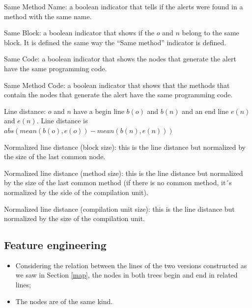 \documentclass[
]{article}
\begin{document}
\normalsize

Same Method Name: a boolean indicator that tells if the alerts were
found in a method with the same name.

Same Block: a boolean indicator that shows if the \(o\) and \(n\) belong
to the same block. It is defined the same way the ``Same method''
indicator is defined.

Same Code: a boolean indicator that shows the nodes that generate the
alert have the same programming code.

Same Method Code: a boolean indicator that shows that the methods that
contain the nodes that generate the alert have the same programming
code.

Line distance: \(o\) and \(n\) have a begin line \(b(o)\) and \(b(n)\)
and an end line \(e(n)\) and \(e(n)\). Line distance is
\(abs(mean(b(o), e(o)) - mean(b(n), e(n)))\)

Normalized line distance (block size): this is the line distance but
normalized by the size of the last common node.

Normalized line distance (method size): this is the line distance but
normalized by the size of the last common method (if there is no common
method, it´s normalized by the side of the compilation unit).

Normalized line distance (compilation unit size): this is the line
distance but normalized by the size of the compilation unit.

\subsection{Feature engineering} \label{feature_creation}

\begin{itemize}
\item
  Considering the relation between the lines of the two versions constructed as we saw in Section \ref{map}, the nodes in both trees begin and end in related lines;

\item
  The nodes are of the same kind.
\end{itemize}

\small
\end{document}
